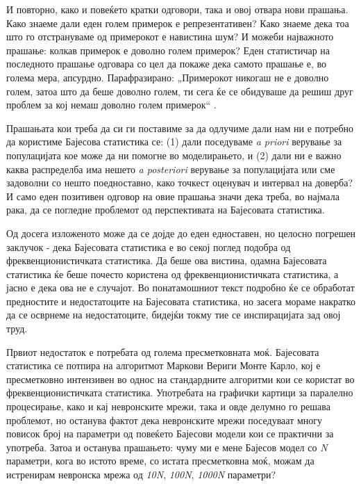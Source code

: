 \documentclass[12pt]{article}
\numberwithin{equation}{section}
\begin{document}
И повторно, како и повеќето кратки одговори, така и овој отвара нови прашања. Како знаеме дали еден голем примерок е репрезентативен? Како знаеме дека тоа што го отстрануваме од примерокот е навистина шум? И можеби најважното прашање: колкав примерок е доволно голем примерок? Еден статистичар на последното прашање одговара со цел да покаже дека самото прашање е, во голема мера, апсурдно. Парафразирано: „Примерокот никогаш не е доволно голем, затоа што да беше доволно голем, ти сега ќе се обидуваше да решиш друг проблем за кој немаш доволно голем примерок“ \cite{never_larg}.

Прашањата кои треба да си ги поставиме за да одлучиме дали нам ни е потребно да користиме Бајесова статистика се: (1) дали поседуваме \textit{a priori} верување за популацијата кое може да ни помогне во моделирањето, и (2) дали ни е важно каква распределба има нешето \textit{a posteriori} верување за популацијата или сме задоволни со нешто поедноставно, како точкест оценувач и интервал на доверба? И само еден позитивен одговор на овие прашања значи дека треба, во најмала рака, да се погледне проблемот од перспективата на Бајесовата статистика.

Од досега изложеното може да се дојде до еден едноставен, но целосно погрешен заклучок - дека Бајесовата статистика е во секој поглед подобра од фреквенционистичката статистика. Да беше ова вистина, одамна Бајесовата статистика ќе беше почесто користена од фреквенционистичката статистика, а јасно е дека ова не е случајот. Во понатамошниот текст подробно ќе се обработат предностите и недостатоците на Бајесовата статистика, но засега мораме накратко да се осврнеме на недостатоците, бидејќи токму тие се инспирацијата зад овој труд.

Првиот недостаток е потребата од голема пресметковната моќ. Бајесовата статистика се потпира на алгоритмот Маркови Вериги Монте Карло, кој е пресметковно интензивен во однос на стандардните алгоритми кои се користат во фреквенционистичката статистика. Употребата на графички картици за паралелно процесирање, како и кај невронските мрежи, така и овде делумно го решава проблемот, но останува фактот дека невронските мрежи поседуваат многу повисок број на параметри од повеќето Бајесови модели кои се практични за употреба. Затоа и останува прашањето: чуму ми е мене Бајесов модел со \textit{N} параметри, кога во истото време, со истата пресметковна моќ, можам да истренирам невронска мрежа од \textit{10N}, \textit{100N}, \textit{1000N} параметри?
\end{document}
